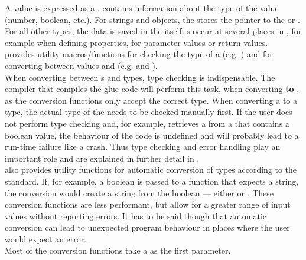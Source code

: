 A  value is expressed as a .  contains information about the type of the value (number, boolean, etc.). For strings and objects, the  stores the pointer to the  or . For all other types, the data is saved in the  itself. s occur at several places in , for example when defining properties, for parameter values or return values.\\
 provides utility macros/functions for checking the type of a \linebreak {} (e.g. ) and for converting between  values and \linebreak(e.g.  and ).\\
When converting between s and  types, type checking is indispensable. The  compiler that compiles the glue code will perform this task, when converting \textbf{to} , as the conversion functions only accept the correct type. When converting a  to a  type, the actual type of the  needs to be checked manually first. If the  user does not perform type checking and, for example, retrieves a  from a  that contains a boolean value, the behaviour of the code is undefined and will probably lead to a run-time failure like a crash. Thus type checking and error handling play an important role and are explained in further detail \linebreak in .\\
 also provides utility functions for automatic conversion of types \linebreak according to the  standard. If, for example, a boolean is passed to a function that expects a string, the conversion would create a string from the boolean --- either  or . These conversion functions are less performant, but allow for a greater range of input values without reporting errors. It has to be said though that automatic conversion can lead to unexpected program behaviour in places where the user would expect an error.\\
Most of the conversion functions take a  as the first parameter.

